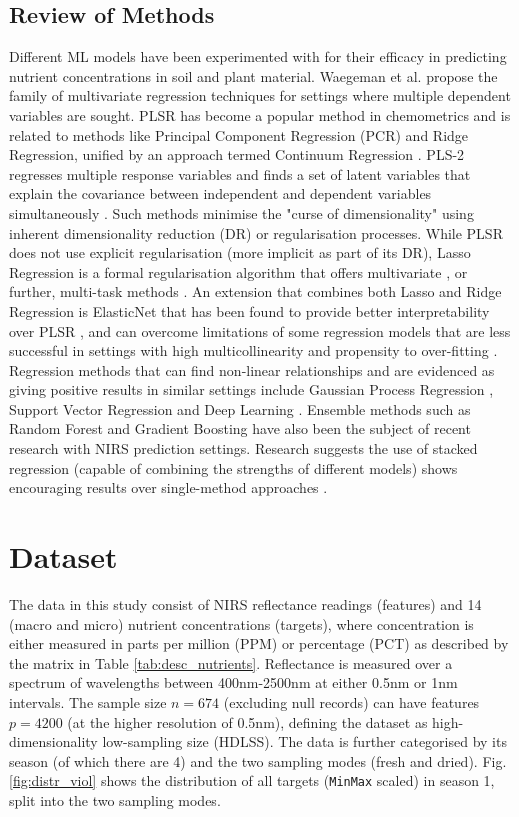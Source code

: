 \documentclass[conference]{IEEEtran}
\begin{document}
\subsection{Review of Methods}\label{lit_review_methods}
Different ML models have been experimented with for their efficacy in predicting nutrient concentrations in soil and plant material. Waegeman et al. \cite{waegeman2018multitargetpredictionunifyingview} propose the family of multivariate regression techniques for settings where multiple dependent variables are sought. PLSR has become a popular method in chemometrics \cite{Liu2015, HaibinLiao2012} and is related to methods like Principal Component Regression (PCR) and Ridge Regression, unified by an approach termed Continuum Regression \cite{Rosipal2006}. PLS-2 regresses multiple response variables and finds a set of latent variables that explain the covariance between independent and dependent variables simultaneously \cite{Garson2016, Liu2022}. Such methods minimise the "curse of dimensionality" using inherent dimensionality reduction (DR) or regularisation processes. While PLSR does not use explicit regularisation (more implicit as part of its DR), Lasso Regression is a formal regularisation algorithm that offers multivariate \cite{Rauschenberger2021}, or further, multi-task methods \cite{Obozinski2006}. An extension that combines both Lasso and Ridge Regression is ElasticNet that has been found to provide better interpretability over PLSR \cite{Fu2019}, and can overcome limitations of some regression models that are less successful in settings with high multicollinearity and propensity to over-fitting \cite{Liu2024}. Regression methods that can find non-linear relationships and are evidenced as giving positive results in similar settings include Gaussian Process Regression \cite{Rasmussen2006,Chen2007}, Support Vector Regression \cite{Tange2015, Fearer2022} and Deep Learning \cite{Cui2018, Huang2023}. Ensemble methods such as Random Forest \cite{Nawar2017, Fearer2022} and Gradient Boosting \cite{Zheng2024, Nawar2017} have also been the subject of recent research with NIRS prediction settings. Research suggests the use of stacked regression (capable of combining the strengths of different models) shows encouraging results over single-method approaches \cite{Dumancas2022}.
\section{Dataset}\label{Dataset}
The data in this study consist of NIRS reflectance readings (features) and 14 (macro and micro) nutrient concentrations (targets), where concentration is either measured in parts per million (PPM) or percentage (PCT) as described by the matrix in Table \ref{tab:desc_nutrients}. Reflectance is measured over a spectrum of wavelengths between 400nm-2500nm at either 0.5nm or 1nm intervals. The sample size $n=674$ (excluding null records) can have features $p=4200$ (at the higher resolution of 0.5nm), defining the dataset as high-dimensionality low-sampling size (HDLSS). The data is further categorised by its season (of which there are 4) and the two sampling modes (fresh and dried). Fig. \ref{fig:distr_viol} shows the distribution of all targets (\texttt{MinMax} scaled) in season 1, split into the two sampling modes. 
\end{document}
